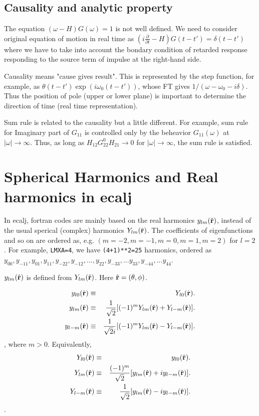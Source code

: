 \documentclass[a4paper,10pt,fleqn]{article}
\begin{document}
\subsection{Causality and analytic property}
The equation $(\omega-H) G(\omega)=1$ is not well defined.
We need to consider original equation of motion in real time as
$(i \frac{\partial }{\partial t}-H) G(t-t')=\delta(t-t')$ where
we have to take into account the bondary condition of retarded response
responding to the source term of impulse at the right-hand side.

Causality means "cause gives result".
This is represented by the step function, for example, as
$\theta(t-t') \exp(i \omega_0 (t-t'))$,
whose FT gives $1/(\omega-\omega_0-i \delta)$. Thus the position of pole 
(upper or lower plane) is important to determine the direction of time (real time representation).

Sum rule is related to the causality but a little different.
For example, sum rule for Imaginary part of $G_{11}$ is controlled 
only by the beheavior $G_{11}(\omega)$ at $|\omega| \to \infty$. Thus, as long as
$H_{12}G^0_{22}H_{21} \to 0$ for  $|\omega| \to \infty$,
the sum rule is satisfied.


\section{Spherical Harmonics and Real harmonics in ecalj}
In ecalj, fortran codes are mainly based on the real harmonics $y_{lm}(\hat{\bf r})$,
instead of the usual sperical (complex) harmonics $Y_{lm}(\hat{\bf r})$.
The coefficients of eigenfunctions and so on are ordered as, e.g.
$(m=-2, m=-1, m=0, m=1,m=2)$ for $l=2$.
For example, \verb#LMXA=4#, we have \verb#(4+1)**2=25# harmonics,
ordered as
$y_{00},y_{-11},y_{01},y_{11},y_{-22},y_{-12},... ,y_{22},y_{-33},...y_{33},
y_{-44},...y_{44}$.

$y_{lm}(\hat{\bf r})$ is defined from $Y_{lm}(\hat{\bf r})$. 
Here $\hat{\bf r}=(\theta, \phi)$. 

\begin{eqnarray}
 y_{l0}(\hat{\bf r}) 
  &\equiv& Y_{l0}(\hat{\bf r}). \\
 y_{lm}(\hat{\bf r}) 
  &\equiv& \frac{1}{\sqrt{2}}
           [ (-1)^m Y_{lm}(\hat{\bf r}) + Y_{l-m}(\hat{\bf r}) ]. \\
 y_{l-m}(\hat{\bf r})
  &\equiv& \frac{1}{\sqrt{2}i}
           [ (-1)^m Y_{lm}(\hat{\bf r}) - Y_{l-m}(\hat{\bf r}) ].
\label{eq:defylm}
\end{eqnarray}
, where $m>0$. Equivalently,
\begin{eqnarray}
 Y_{l0}(\hat{\bf r}) 
  &\equiv& y_{l0}(\hat{\bf r}). \\
 Y_{lm}(\hat{\bf r}) 
  &\equiv& \frac{(-1)^m}{\sqrt{2}}
           [ y_{lm}(\hat{\bf r}) + iy_{l-m}(\hat{\bf r}) ]. \\
 Y_{l-m}(\hat{\bf r})
  &\equiv& \frac{1}{\sqrt{2}}
           [ y_{lm}(\hat{\bf r}) - iy_{l-m}(\hat{\bf r}) ].
\end{eqnarray}.
\end{document}
